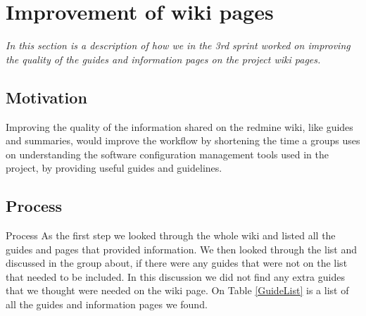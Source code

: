 \section{Improvement of wiki pages}
\textit{In this section is a description of how we in the 3rd sprint worked on improving the quality of the guides and information pages on the project wiki pages.}

\subsection{Motivation}
Improving the quality of the information shared on the redmine wiki, like guides and summaries, would improve the workflow by shortening the time a groups uses on understanding the software configuration management tools used in the project, by providing useful guides and guidelines.


\subsection{Process}
Process
As the first step we looked through the whole wiki and listed all the guides and pages that provided information. We then looked through the list and discussed in the group about, if there were any guides that were not on the list that needed to be included. In this discussion we did not find any extra guides that we thought were needed on the wiki page. On Table \ref{GuideList} is a list of all the guides and information pages we found.

